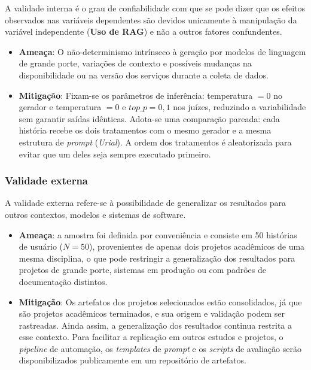 A validade interna é o grau de confiabilidade com que se pode dizer que os efeitos observados nas variáveis dependentes são devidos unicamente à manipulação da variável independente (\textbf{Uso de RAG}) e não a outros fatores confundentes.

\begin{itemize}
    \item \textbf{Ameaça}: O não-determinismo intrínseco à geração por modelos de linguagem de grande porte, variações de contexto e possíveis mudanças na disponibilidade ou na versão dos serviços durante a coleta de dados.

    \item \textbf{Mitigação}: Fixam-se os parâmetros de inferência: temperatura $= 0$ no gerador e temperatura $= 0$ e $top\_p = 0{,}1$ nos juízes, reduzindo a variabilidade sem garantir saídas idênticas. Adota-se uma comparação pareada: cada história recebe os dois tratamentos com o mesmo gerador e a mesma estrutura de \textit{prompt} (\textit{Urial}). A ordem dos tratamentos é aleatorizada para evitar que um deles seja sempre executado primeiro.
\end{itemize}

\subsubsection*{Validade externa}

A validade externa refere-se à possibilidade de generalizar os resultados para outros contextos, modelos e sistemas de software.

\begin{itemize}
    \item \textbf{Ameaça}: a amostra foi definida por conveniência e consiste em 50 histórias de usuário ($N = 50$), provenientes de apenas dois projetos acadêmicos de uma mesma disciplina, o que pode restringir a generalização dos resultados para projetos de grande porte, sistemas em produção ou com padrões de documentação distintos.

    \item \textbf{Mitigação}: Os artefatos dos projetos selecionados estão consolidados, já que são projetos acadêmicos terminados, e sua origem e validação podem ser rastreadas. Ainda assim, a generalização dos resultados continua restrita a esse contexto. Para facilitar a replicação em outros estudos e projetos, o \textit{pipeline} de automação, os \textit{templates} de \textit{prompt} e os \textit{scripts} de avaliação serão disponibilizados publicamente em um repositório de artefatos.
\end{itemize}

